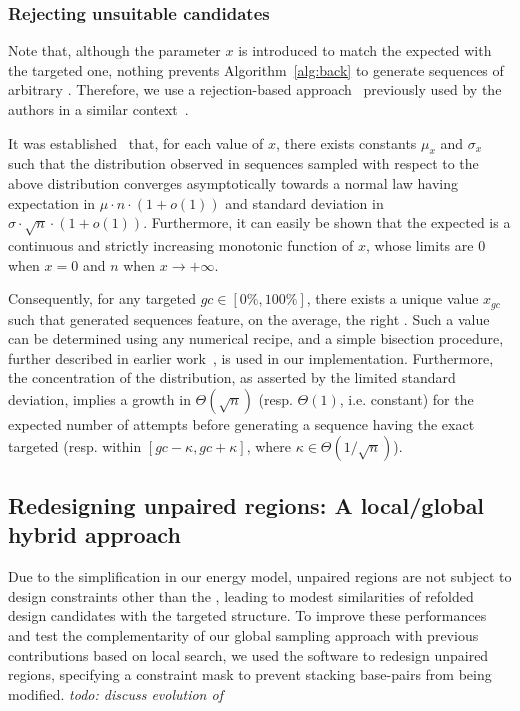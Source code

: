 \subsubsection{Rejecting unsuitable candidates}

Note that, although the parameter $x$ is introduced to match the expected \GCContent with the targeted one, nothing prevents Algorithm~\ref{alg:back} to generate sequences of arbitrary \GCContent. Therefore, we use a rejection-based approach~\cite{Bodini2010} previously used by the authors in a similar context~\cite{Waldispuhl2011}.

It was established~\cite{Waldispuhl2011} that, for each value of $x$, there exists constants $\mu_x$ and $\sigma_x$ such that the \GCContent distribution observed in sequences sampled with respect to the above distribution converges asymptotically towards a normal law having expectation in $\mu\cdot n\cdot(1+o(1))$ and standard deviation in $\sigma\cdot\sqrt{n}\cdot(1+o(1))$.
Furthermore, it can easily be shown that the expected \GCContent is a continuous and strictly increasing monotonic  function of $x$, whose limits are $0$ when $x=0$ and $n$ when $x\to +\infty$. 

Consequently, for any targeted \GCContent $gc\in[0\%,100\%]$, there exists a unique value $x_{gc}$ such that generated sequences feature, on the average, the right \GCContent. Such a value can be determined using any numerical recipe, and a simple bisection procedure, further described in earlier work~\cite{Waldispuhl2011}, is used in our implementation. Furthermore, the concentration of the distribution, as asserted by the limited standard deviation, implies a growth in $\Theta(\sqrt{n})$ (resp. $\Theta(1)$, i.e. constant) for the expected number of attempts before generating a sequence having the exact targeted \GCContent  (resp. within $[gc-\kappa,gc+\kappa]$, where $\kappa\in\Theta(1/\sqrt n)$).



\subsection{Redesigning unpaired regions: A local/global hybrid approach}
\label{subsec:glocal_method}
Due to the simplification in our energy model, unpaired regions are not subject to design constraints other than the \GCContent, leading to modest similarities of refolded design candidates with the targeted structure. To improve these performances and test the complementarity  of our global sampling approach with previous contributions based on local search, we used the \RNAinverse software to redesign unpaired regions, specifying a constraint mask to prevent stacking base-pairs from being modified.
{\em todo: discuss evolution of \GCContent}



